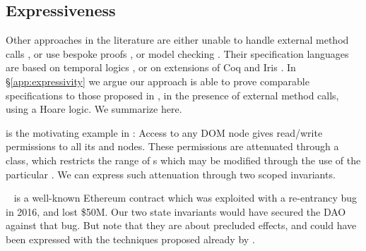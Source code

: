 \newcommand{\paragraphSDD}[1]{\vspace{.01cm}\noindent{\textit{#1}}}

\subsection{Expressiveness} 

Other approaches in the literature are either unable to handle external method calls \cite{OOPSLA22}, or use  bespoke proofs \cite{dd,irisWasm23}, or model checking \cite{VerX}.
Their specification languages are based on temporal logics \cite{VerX,OOPSLA22}, or on extensions of Coq and Iris \cite{dd,IrisWasm23}.
In \S \ref{app:expressivity} we argue our approach is able to prove comparable specifications to those proposed in  \cite{OOPSLA22,dd,VerX,irisWasm23}, in the presence of external method calls,
using a Hoare logic.
We   summarize here.

 

\paragraphSDD{DOM} is the motivating example  in \cite{dd}: Access to any DOM node
gives read/write  permissions to  all its  and  nodes. 
These permissions are attenuated   through a  class, %
 which restricts the range of s which may be modified through the use of the particular . 
We can express such  attenuation   through two scoped invariants.

\paragraphSDD{DAO} %
 ~\cite{Dao}  is a well-known Ethereum contract   which was exploited with a re-entrancy bug in 2016, 
and lost \$50M. 
Our two state invariants  would have secured the DAO against that bug. %
But note  that they are about precluded effects, and 
 could have been expressed with the techniques proposed already by \cite{MeyerDBC92}.
 
